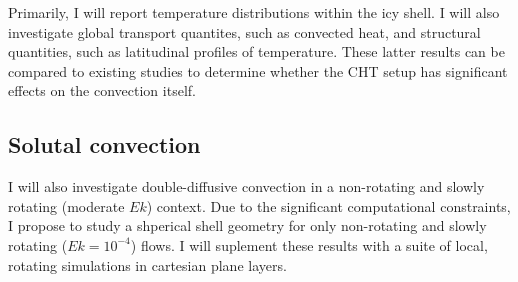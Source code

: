 \documentclass{article}
\begin{document}
Primarily, I will report temperature distributions within the icy shell. I will also investigate global transport quantites, such as convected heat, and structural quantities, such as latitudinal profiles of temperature. 
These latter results can be compared to existing studies \citep[e.g.][]{dL23,kS19,jK22} to determine whether the CHT setup has significant effects on the convection itself.
\subsection{Solutal convection}
I will also investigate double-diffusive convection in a non-rotating and slowly rotating (moderate $Ek$) context. Due to the significant computational constraints, I propose to study a shperical shell geometry for only non-rotating and slowly rotating ($Ek = 10^{-4}$) flows. I will suplement these results with a suite of local, rotating simulations in cartesian plane layers.

\small
\end{document}
